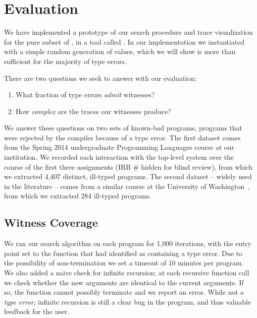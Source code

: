 \section{Evaluation}
\label{sec:evaluation}

%
%
We have implemented a prototype of our search procedure and trace
visualization for the pure subset of \ocaml, in a tool called \nanomaly.
%
In our implementation we instantiated \gensym with a simple random
generation of values, which we will show is more than sufficient for the
majority of type errors.

There are two questions we seek to answer with our evaluation:
\begin{enumerate}
\item What fraction of type errors \emph{admit} witnesses?
\item How \emph{complex} are the traces our witnesses produce?
\end{enumerate}

We answer these questions on two sets of known-bad programs, \ie
programs that were rejected by the \ocaml compiler because of a type
error.
%
The first dataset comes from the Spring 2014 undergraduate Programming
Languages course at our institution.
%
We recorded each interaction with the \ocaml top-level system over the
course of the first three assignments (IRB \# hidden for blind review), %
from which we extracted 4,407 distinct, ill-typed \ocaml programs.
%
The second dataset -- widely used in the literature -- comes from a
similar course at the University of
Washington~\cite{lerner_seminal:_2006}, from which we extracted 284
ill-typed programs.

\subsection{Witness Coverage}
\label{sec:eval:witness-coverage}
%
We ran our search algorithm on each program for 1,000 iterations, with
the entry point set to the function that \ocaml had identified as
containing a type error.
%
Due to the possibility of non-termination we set a timeout of 10 minutes
per program.
%
We also added a na\"ive check for infinite recursion; at each recursive
function call we check whether the new arguments are identical to the
current arguments.
%
If so, the function cannot possibly terminate and we report an error.
%
While not a \emph{type error}, infinite recursion is still a clear bug
in the program, and thus valuable feedback for the user.

